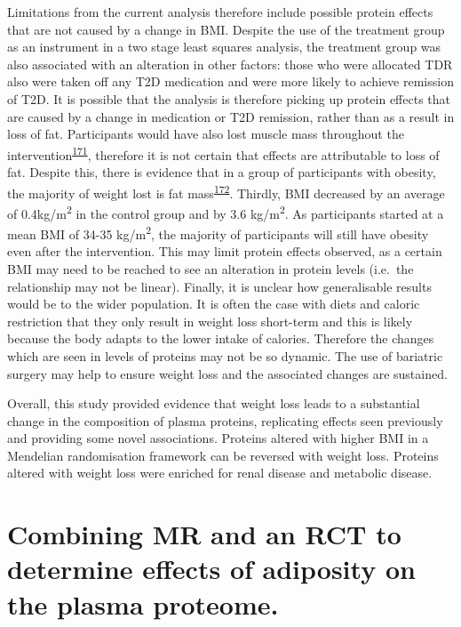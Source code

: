 \documentclass[11pt,twoside]{bristolthesis}
\begin{document}
Limitations from the current analysis therefore include possible protein effects that are not caused by a change in BMI. Despite the use of the treatment group as an instrument in a two stage least squares analysis, the treatment group was also associated with an alteration in other factors: those who were allocated TDR also were taken off any T2D medication and were more likely to achieve remission of T2D. It is possible that the analysis is therefore picking up protein effects that are caused by a change in medication or T2D remission, rather than as a result in loss of fat. Participants would have also lost muscle mass throughout the intervention\textsuperscript{\protect\hyperlink{ref-Santanasto2011}{171}}, therefore it is not certain that effects are attributable to loss of fat. Despite this, there is evidence that in a group of participants with obesity, the majority of weight lost is fat mass\textsuperscript{\protect\hyperlink{ref-Backx2016}{172}}. Thirdly, BMI decreased by an average of 0.4kg/m\textsuperscript{2} in the control group and by 3.6 kg/m\textsuperscript{2}. As participants started at a mean BMI of 34-35 kg/m\textsuperscript{2}, the majority of participants will still have obesity even after the intervention. This may limit protein effects observed, as a certain BMI may need to be reached to see an alteration in protein levels (i.e.~the relationship may not be linear). Finally, it is unclear how generalisable results would be to the wider population. It is often the case with diets and caloric restriction that they only result in weight loss short-term and this is likely because the body adapts to the lower intake of calories. Therefore the changes which are seen in levels of proteins may not be so dynamic. The use of bariatric surgery may help to ensure weight loss and the associated changes are sustained.

Overall, this study provided evidence that weight loss leads to a substantial change in the composition of plasma proteins, replicating effects seen previously and providing some novel associations. Proteins altered with higher BMI in a Mendelian randomisation framework can be reversed with weight loss. Proteins altered with weight loss were enriched for renal disease and metabolic disease.

\hypertarget{Comparison-proteome}{%
\chapter{Combining MR and an RCT to determine effects of adiposity on the plasma proteome.}\label{Comparison-proteome}}
\end{document}
